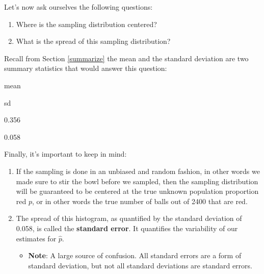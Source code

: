 \documentclass[12pt,]{krantz}
\makeatletter
\newenvironment{Shaded}{\begin{snugshade}}{\end{snugshade}}
\newcommand{\KeywordTok}[1]{\textcolor[rgb]{0.27,0.27,0.27}{\textbf{#1}}}
\newcommand{\DataTypeTok}[1]{\textcolor[rgb]{0.27,0.27,0.27}{#1}}
\newcommand{\StringTok}[1]{\textcolor[rgb]{0.5,0.5,0.5}{#1}}
\newcommand{\OperatorTok}[1]{\textcolor[rgb]{0.43,0.43,0.43}{\textbf{#1}}}
\newcommand{\NormalTok}[1]{#1}
\providecommand{\tightlist}{%
  \setlength{\itemsep}{0pt}\setlength{\parskip}{0pt}}
\newenvironment{kframe}{%
\medskip{}
\setlength{\fboxsep}{.8em}
 \def\at@end@of@kframe{}%
 \ifinner\ifhmode%
  \def\at@end@of@kframe{\end{minipage}}%
  \begin{minipage}{\columnwidth}%
 \fi\fi%
 \def\FrameCommand##1{\hskip\@totalleftmargin \hskip-\fboxsep
 \colorbox{shadecolor}{##1}\hskip-\fboxsep
     \hskip-\linewidth \hskip-\@totalleftmargin \hskip\columnwidth}%
 \MakeFramed {\advance\hsize-\width
   \@totalleftmargin\z@ \linewidth\hsize
   \@setminipage}}%
 {\par\unskip\endMakeFramed%
 \at@end@of@kframe}
\renewenvironment{Shaded}{\begin{kframe}}{\end{kframe}}
\makeatother
\begin{document}
Let's now ask ourselves the following questions:

\begin{enumerate}
\def\labelenumi{\arabic{enumi}.}
\tightlist
\item
  Where is the sampling distribution centered?
\item
  What is the spread of this sampling distribution?
\end{enumerate}

Recall from Section \ref{summarize} the mean and the standard deviation
are two summary statistics that would answer this question:

\begin{Shaded}
\end{Shaded}

mean

sd

0.356

0.058

Finally, it's important to keep in mind:

\begin{enumerate}
\def\labelenumi{\arabic{enumi}.}
\tightlist
\item
  If the sampling is done in an unbiased and random fashion, in other
  words we made sure to stir the bowl before we sampled, then the
  sampling distribution will be guaranteed to be centered at the true
  unknown population proportion red \(p\), or in other words the true
  number of balls out of 2400 that are red.
\item
  The spread of this histogram, as quantified by the standard deviation
  of 0.058, is called the \textbf{standard error}. It quantifies the
  variability of our estimates for \(\widehat{p}\).

  \begin{itemize}
  \tightlist
  \item
    \textbf{Note}: A large source of confusion. All standard errors are
    a form of standard deviation, but not all standard deviations are
    standard errors.
  \end{itemize}
\end{enumerate}
\end{document}
